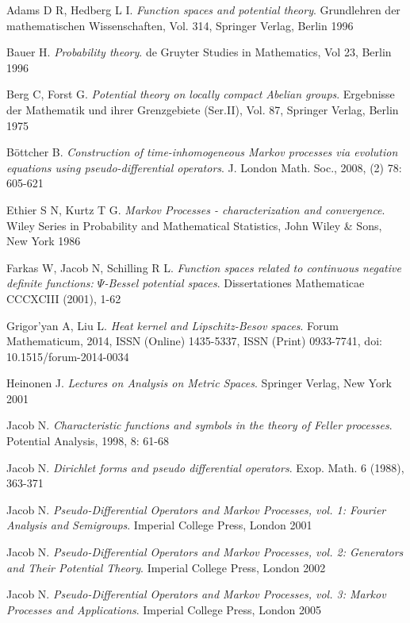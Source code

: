 \documentclass[a4paper, 12pt]{report}
\theoremstyle{cor}
\theoremstyle{remark}
\theoremstyle{definition}
\begin{document}
\begin{thebibliography}{99}

 Adams D R, Hedberg L I.  \emph{Function spaces and potential theory}.  Grundlehren der mathematischen Wissenschaften, Vol. 314, Springer Verlag, Berlin 1996

 Bauer H.  \emph{Probability theory}. de Gruyter Studies in Mathematics, Vol 23, Berlin 1996

 Berg C, Forst G.  \emph{Potential theory on locally compact Abelian groups}.  Ergebnisse der Mathematik und ihrer Grenzgebiete (Ser.II), Vol. 87, Springer Verlag, Berlin 1975

 B\"ottcher B.  \emph{Construction of time-inhomogeneous Markov processes via evolution equations using pseudo-differential operators}.  J. London Math. Soc., 2008, (2) 78: 605-621

 Ethier S N, Kurtz T G.  \emph{Markov Processes - characterization and convergence}.  Wiley Series in Probability and Mathematical Statistics, John Wiley \& Sons, New York 1986

 Farkas W, Jacob N, Schilling R L.  \emph{Function spaces related to continuous negative definite functions: $\Psi$-Bessel potential spaces}.  Dissertationes Mathematicae CCCXCIII (2001), 1-62

 Grigor'yan A, Liu L.  \emph{Heat kernel and Lipschitz-Besov spaces}.  Forum Mathematicum, 2014, ISSN (Online) 1435-5337, ISSN (Print) 0933-7741, doi: 10.1515/forum-2014-0034

 Heinonen J.  \emph{Lectures on Analysis on Metric Spaces}.  Springer Verlag, New York 2001

 Jacob N.  \emph{Characteristic functions and symbols in the theory of Feller processes}.  Potential Analysis, 1998, 8: 61-68

 Jacob N.  \emph{Dirichlet forms and pseudo differential operators}.  Exop. Math. 6 (1988), 363-371

 Jacob N.  \emph{Pseudo-Differential Operators and Markov Processes, vol. 1: Fourier Analysis and Semigroups}.  Imperial College Press, London 2001

 Jacob N.  \emph{Pseudo-Differential Operators and Markov Processes, vol. 2: Generators and Their Potential Theory}.  Imperial College Press, London 2002

 Jacob N.  \emph{Pseudo-Differential Operators and Markov Processes, vol. 3: Markov Processes and Applications}.  Imperial College Press, London 2005


\end{thebibliography}
\end{document}

